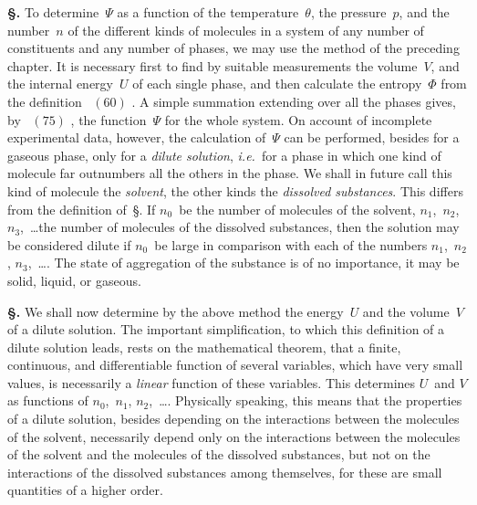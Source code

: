 \documentclass[12pt]{book}[2005/09/16]
\newcommand{\Chg}[2]{#2}
\newcommand{\Add}[1]{\Chg{}{#1}}
\newcommand{\Section}[1]{
  \medskip\par\textbf{§\;#1}
  \label{section:#1}
}
\newcommand{\SecRef}[2][§\;]{\hyperref[section:#2.]{{\upshape #1#2}}}
\newcommand{\Eq}[1]{%
  \hyperref[eqn:#1]{\ensuremath{#1}}%
}
\newcommand{\PageSep}[1]{\ignorespaces}
\newcommand{\ie}{\emph{i.e.}}
\begin{document}
\Section{249.} To determine~$\Psi$ as a function of the temperature~$\theta$,
the pressure~$p$, and the number~$n$ of the different kinds of
molecules in a system of any number of constituents and
any number of phases, we may use the method of the preceding
chapter. It is necessary first to find by suitable
measurements the volume~$V$, and the internal energy~$U$ of
each single phase, and then calculate the entropy~$\Phi$ from
the definition~\Eq{(60)}. A simple summation extending over
all the phases gives, by~\Eq{(75)}, the function~$\Psi$ for the whole
system. On account of incomplete experimental data, however,
the calculation of~$\Psi$ can be performed, besides for a
gaseous phase, only for a \emph{dilute solution}, \ie\ for a phase in
which one kind of molecule far outnumbers all the others in
the phase. We shall in future call this kind of molecule
the \emph{solvent}, the other kinds the \emph{dissolved substances}. This
differs from the definition of~\SecRef{220}. If $n_{0}$~be the number
of molecules of the solvent, $n_{1}$,~$n_{2}$, $n_{3}$,~\dots the number of
molecules of the dissolved substances, then the solution
may be considered dilute if $n_{0}$~be large in comparison with
each of the numbers $n_{1}$,~$n_{2}$, $n_{3}$\Add{,}~\dots. The state of aggregation
of the substance is of no importance, it may be solid,
liquid, or gaseous.

\Section{250.} We shall now determine by the above method
the energy~$U$ and the volume~$V$ of a dilute solution. The
important simplification, to which this definition of a dilute
solution leads, rests on the mathematical theorem, that a
finite, continuous, and differentiable function of several
\PageSep{224}
variables, which have very small values, is necessarily a
\emph{linear} function of these variables. This determines $U$~and
$V$ as functions of $n_{0}$,~$n_{1}$, $n_{2}$,~\dots\Add{.} Physically speaking, this
means that the properties of a dilute solution, besides
depending on the interactions between the molecules of the
solvent, necessarily depend only on the interactions between
the molecules of the solvent and the molecules of the dissolved
substances, but not on the interactions of the dissolved
substances among themselves, for these are small quantities
of a higher order.
\end{document}
